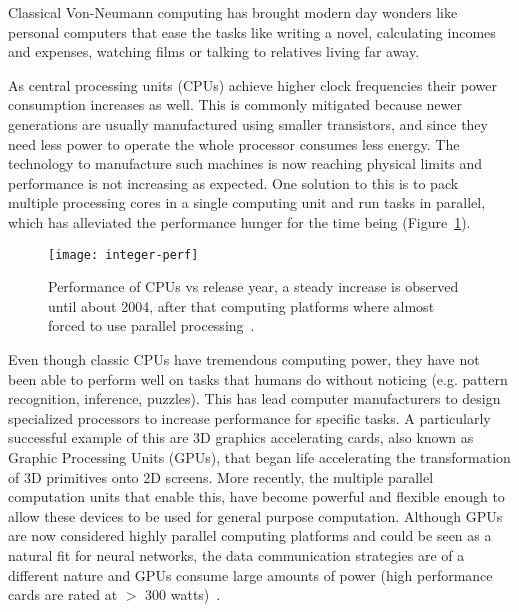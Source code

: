 Classical Von-Neumann computing has brought modern day wonders like personal computers that ease the tasks like writing a novel, calculating incomes and expenses, watching films or talking to relatives living far away. 

As central processing units (CPUs) achieve higher clock frequencies their power consumption increases as well. This is commonly mitigated because newer generations are usually manufactured using smaller transistors, and since they need less power to operate the whole processor consumes less energy. The technology to manufacture such machines is now reaching physical limits and performance is not increasing as expected. One solution to this is to pack multiple processing cores in a single computing unit and run tasks in parallel, which has alleviated the performance hunger for the time being (Figure~\ref{fig:comp:moore}). 

\begin{figure}[h]
  \begin{center}
    \texttt{[image: integer-perf]}%
    \caption{Performance of CPUs vs release year, a steady increase is observed until about 2004, after that computing platforms where almost forced to use parallel processing~\cite{int-perf-images}. }%
    \label{fig:comp:moore}
  \end{center}
\end{figure}

Even though classic CPUs have tremendous computing power, they have not been able to perform well on tasks that humans do without noticing (e.g. pattern recognition, inference, puzzles). This has lead computer manufacturers to design specialized processors to increase performance for specific tasks. A particularly successful example of this are 3D graphics accelerating cards, also known as Graphic Processing Units (GPUs), that began life accelerating the transformation of 3D primitives onto 2D screens. More recently, the multiple parallel computation units that enable this, have become powerful and flexible enough to allow these devices to be used for general purpose computation.
Although GPUs are now considered highly parallel computing platforms and could be seen as a natural fit for neural networks, the data communication strategies are of a different nature and GPUs consume large amounts of power (high performance cards are rated at $>$ 300 watts)~\cite{nvidia, amd}.


